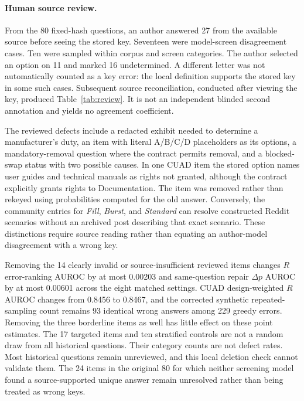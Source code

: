\paragraph{Human source review.}
From the 80 fixed-hash questions, an author answered 27 from the available source before seeing the stored key. Seventeen were model-screen disagreement cases. Ten were sampled within corpus and screen categories. The author selected an option on 11 and marked 16 undetermined. A different letter was not automatically counted as a key error: the local definition supports the stored key in some such cases. Subsequent source reconciliation, conducted after viewing the key, produced Table~\ref{tab:review}. It is not an independent blinded second annotation and yields no agreement coefficient.

The reviewed defects include a redacted exhibit needed to determine a manufacturer's duty, an item with literal A/B/C/D placeholders as its options, a mandatory-removal question where the contract permits removal, and a blocked-swap status with two possible causes. In one CUAD item the stored option names user guides and technical manuals as rights not granted, although the contract explicitly grants rights to Documentation. The item was removed rather than rekeyed using probabilities computed for the old answer. Conversely, the community entries for \emph{Fill}, \emph{Burst}, and \emph{Standard} can resolve constructed Reddit scenarios without an archived post describing that exact scenario. These distinctions require source reading rather than equating an author-model disagreement with a wrong key.

Removing the 14 clearly invalid or source-insufficient reviewed items changes $R$ error-ranking AUROC by at most 0.00203 and same-question repair $\Delta p$ AUROC by at most 0.00601 across the eight matched settings. CUAD design-weighted $R$ AUROC changes from 0.8456 to 0.8467, and the corrected synthetic repeated-sampling count remains 93 identical wrong answers among 229 greedy errors. Removing the three borderline items as well has little effect on these point estimates. The 17 targeted items and ten stratified controls are not a random draw from all historical questions. Their category counts are not defect rates. Most historical questions remain unreviewed, and this local deletion check cannot validate them. The 24 items in the original 80 for which neither screening model found a source-supported unique answer remain unresolved rather than being treated as wrong keys.

